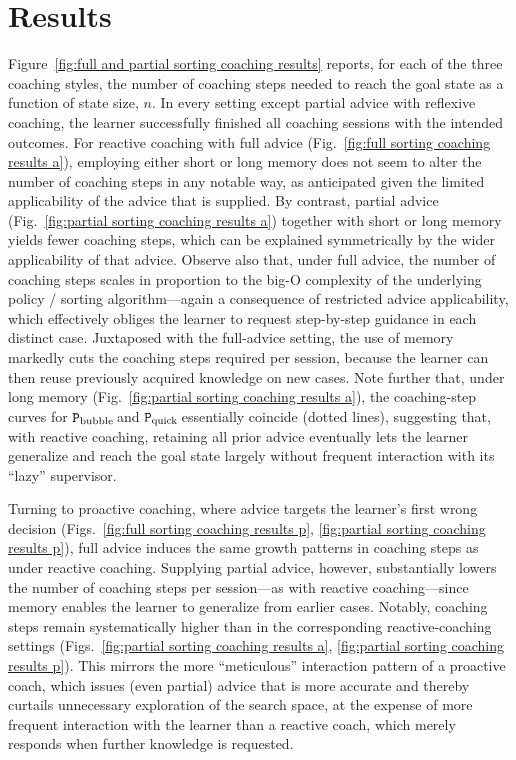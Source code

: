 \documentclass[a4paper,twoside]{article}
\newcommand{\bubblecoach}{\ensuremath{\texttt{P}_{\rm bubble}}\,}
\newcommand{\quickcoach}{\ensuremath{\texttt{P}_{\rm quick}}\,}
\begin{document}
\section{Results}\label{subsec:sorting-results}
%
Figure~\ref{fig:full and partial sorting coaching results} reports, for each of the three coaching styles, the number of coaching steps needed to reach the goal state as a function of state size, $n$. In every setting except partial advice with reflexive coaching, the learner successfully finished all coaching sessions with the intended outcomes. For reactive coaching with full advice (Fig.~\ref{fig:full sorting coaching results a}), employing either short or long memory does not seem to alter the number of coaching steps in any notable way, as anticipated given the limited applicability of the advice that is supplied. By contrast, partial advice (Fig.~\ref{fig:partial sorting coaching results a}) together with short or long memory yields fewer coaching steps, which can be explained symmetrically by the wider applicability of that advice. Observe also that, under full advice, the number of coaching steps scales in proportion to the big-O complexity of the underlying policy / sorting algorithm---again a consequence of restricted advice applicability, which effectively obliges the learner to request step-by-step guidance in each distinct case. Juxtaposed with the full-advice setting, the use of memory markedly cuts the coaching steps required per session, because the learner can then reuse previously acquired knowledge on new cases. Note further that, under long memory (Fig.~\ref{fig:partial sorting coaching results a}), the coaching-step curves for \bubblecoach and \quickcoach essentially coincide (dotted lines), suggesting that, with reactive coaching, retaining all prior advice eventually lets the learner generalize and reach the goal state largely without frequent interaction with its ``lazy'' supervisor.

Turning to proactive coaching, where advice targets the learner's first wrong decision (Figs.~\ref{fig:full sorting coaching results p}, \ref{fig:partial sorting coaching results p}), full advice induces the same growth patterns in coaching steps as under reactive coaching. Supplying partial advice, however, substantially lowers the number of coaching steps per session---as with reactive coaching---since memory enables the learner to generalize from earlier cases. Notably, coaching steps remain systematically higher than in the corresponding reactive-coaching settings (Figs.~\ref{fig:partial sorting coaching results a}, \ref{fig:partial sorting coaching results p}). This mirrors the more ``meticulous'' interaction pattern of a proactive coach, which issues (even partial) advice that is more accurate and thereby curtails unnecessary exploration of the search space, at the expense of more frequent interaction with the learner than a reactive coach, which merely responds when further knowledge is requested.
\end{document}

